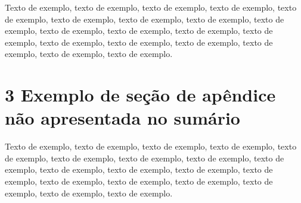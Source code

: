 \documentclass[
	12pt,				%
	oneside,			%
	a4paper,			%
	english,			%
	brazil				%
	]{abntex2ppgsi}
\begin{document}
\begin{apendicesenv}
Texto de exemplo, texto de exemplo, texto de exemplo, texto de exemplo, texto de exemplo, texto de exemplo, texto de exemplo, texto de exemplo, texto de exemplo, texto de exemplo, texto de exemplo, texto de exemplo, texto de exemplo, texto de exemplo, texto de exemplo, texto de exemplo, texto de exemplo, texto de exemplo, texto de exemplo.

\section*{3 Exemplo de seção de apêndice não apresentada no sumário}

Texto de exemplo, texto de exemplo, texto de exemplo, texto de exemplo, texto de exemplo, texto de exemplo, texto de exemplo, texto de exemplo, texto de exemplo, texto de exemplo, texto de exemplo, texto de exemplo, texto de exemplo, texto de exemplo, texto de exemplo, texto de exemplo, texto de exemplo, texto de exemplo, texto de exemplo.

\end{apendicesenv}


\end{document}
